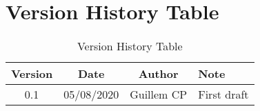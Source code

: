\section{Version History Table}

\begin{table}[h]
	\centering
	\begin{tabular}{|c|c|c|l|}
		\hline
		Version & Date       & Author     & Note                                \\ \hline
		0.1     & 05/08/2020 & Guillem CP & First draft                         \\ \hline
	\end{tabular}
	\caption{Version History Table}
	\label{tab:version-table}
\end{table}
